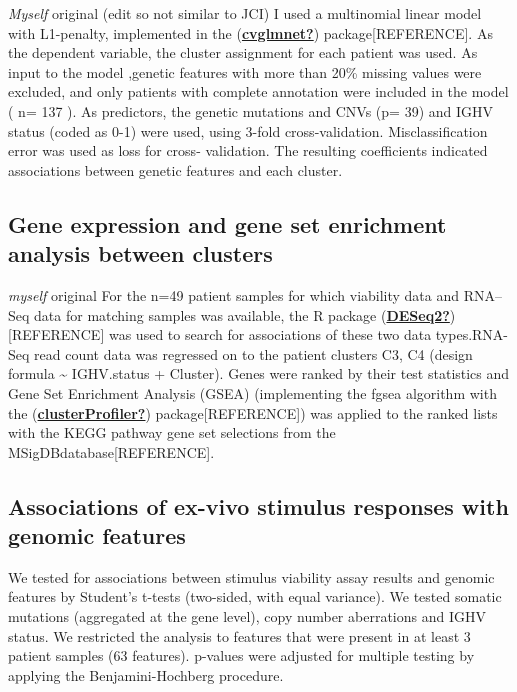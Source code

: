 \documentclass[11pt, a4paper, twosided]{book}
\begin{document}
\emph{Myself} original (edit so not similar to JCI)
I used a multinomial linear model with L1-penalty, implemented in the (\protect\hyperlink{ref-cvglmnet}{\textbf{cvglmnet?}}) package{[}REFERENCE{]}. As the dependent variable, the cluster assignment for each patient was used. As input to the model ,genetic features with more than 20\% missing values were excluded, and only patients with complete annotation were included in the model ( n= 137 ). As predictors, the genetic mutations and CNVs (p= 39) and IGHV status (coded as 0-1) were used, using 3-fold cross-validation. Misclassification error was used as loss for cross- validation. The resulting coefficients indicated associations between genetic features and each cluster.

\hypertarget{gene-expression-and-gene-set-enrichment-analysis-between-clusters}{%
\subsection{Gene expression and gene set enrichment analysis between clusters}\label{gene-expression-and-gene-set-enrichment-analysis-between-clusters}}

\emph{myself} original
For the n=49 patient samples for which viability data and RNA--Seq data for matching samples was available, the R package (\protect\hyperlink{ref-DESeq2}{\textbf{DESeq2?}}){[}REFERENCE{]} was used to search for associations of these two data types.RNA-Seq read count data was regressed on to the patient clusters C3, C4 (design formula \textasciitilde{} IGHV.status + Cluster). Genes were ranked by their test statistics and Gene Set Enrichment Analysis (GSEA) (implementing the fgsea algorithm with the (\protect\hyperlink{ref-clusterProfiler}{\textbf{clusterProfiler?}}) package{[}REFERENCE{]}) was applied to the ranked lists with the KEGG pathway gene set selections from the MSigDBdatabase{[}REFERENCE{]}.

\hypertarget{associations-of-ex-vivo-stimulus-responses-with-genomic-features}{%
\subsection{Associations of ex-vivo stimulus responses with genomic features}\label{associations-of-ex-vivo-stimulus-responses-with-genomic-features}}

We tested for associations between stimulus viability assay results and genomic features by Student's t-tests (two-sided, with equal variance). We tested somatic mutations (aggregated at the gene level), copy number aberrations and IGHV status. We restricted the analysis to features that were present in at least 3 patient samples (63 features). p-values were adjusted for multiple testing by applying the Benjamini-Hochberg procedure.
\end{document}
